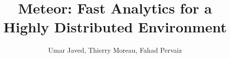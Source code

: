 \documentclass{article}
\begin{document}
\title{Meteor: Fast Analytics for a Highly Distributed Environment}
\author{Umar Javed, Thierry Moreau, Fahad Pervaiz}

\maketitle










\end{document}
